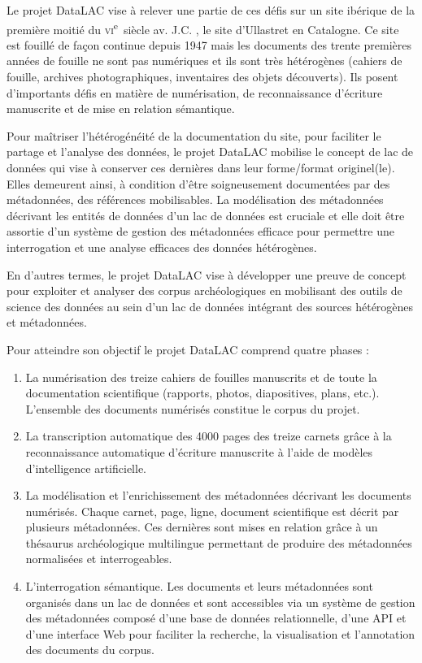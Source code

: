 \documentclass[final, fra]{anthology-ch}     %
\begin{document}
Le projet DataLAC vise à relever une partie de ces défis sur un site ibérique de la première moitié du \textsc{vi}\textsuperscript{e}~siècle av. J.C. , le site d'Ullastret en Catalogne. Ce site est fouillé de façon continue depuis 1947 mais les documents des trente premières années de fouille ne sont pas numériques et ils sont très hétérogènes (cahiers de fouille, archives photographiques, inventaires des objets découverts). Ils posent d’importants défis en matière de numérisation, de reconnaissance d’écriture manuscrite et de mise en relation sémantique.

Pour maîtriser l'hétérogénéité de la documentation du site, pour faciliter le partage et l’analyse des données, le projet DataLAC mobilise le concept de lac de données qui vise à conserver ces dernières dans leur forme/format originel(le). Elles demeurent ainsi, à condition d’être soigneusement documentées par des métadonnées, des références mobilisables. La modélisation des métadonnées décrivant les entités de données d’un lac de données est cruciale et elle doit être assortie d'un système de gestion des métadonnées efficace pour permettre une interrogation et une analyse efficaces des données hétérogènes. 


En d'autres termes, le projet DataLAC vise à développer une preuve de concept pour exploiter et analyser des corpus archéologiques en mobilisant des outils de science des données au sein d'un lac de données intégrant des sources hétérogènes et métadonnées.

Pour atteindre son objectif le projet DataLAC comprend quatre phases : 
\begin{enumerate}
    \item La numérisation des treize cahiers de fouilles manuscrits et de toute la documentation scientifique (rapports, photos, diapositives, plans, etc.). L'ensemble des documents numérisés constitue le corpus du projet.
    \item La transcription automatique des 4000 pages des treize carnets grâce à la reconnaissance automatique d’écriture manuscrite à l'aide de modèles d'intelligence artificielle. 
    \item La modélisation et l'enrichissement des métadonnées décrivant les documents numérisés. Chaque carnet, page, ligne, document scientifique est décrit par plusieurs métadonnées. Ces dernières sont mises en relation grâce à un thésaurus archéologique multilingue permettant de produire des métadonnées normalisées et interrogeables.
    \item L'interrogation sémantique. Les documents et leurs  métadonnées sont organisés dans un lac de données et sont accessibles via un système de gestion des métadonnées composé d'une base de données relationnelle, d'une API et d'une interface Web pour faciliter la recherche, la visualisation et l'annotation des documents du corpus.
\end{enumerate}
\end{document}

